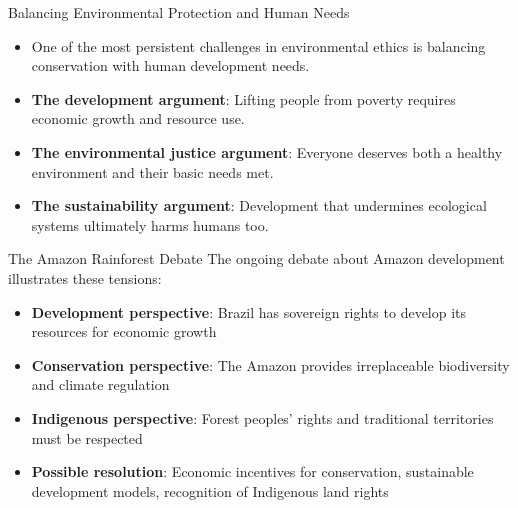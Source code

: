 \documentclass{beamer}
\begin{document}
	\begin{frame}{Balancing Environmental Protection and Human Needs}
		\begin{itemize}
			\item One of the most persistent challenges in environmental ethics is balancing conservation with human development needs.
			\item \textbf{The development argument}: Lifting people from poverty requires economic growth and resource use.
			\item \textbf{The environmental justice argument}: Everyone deserves both a healthy environment and their basic needs met.
			\item \textbf{The sustainability argument}: Development that undermines ecological systems ultimately harms humans too.
		\end{itemize}
		
		\begin{block}{The Amazon Rainforest Debate}
			\scriptsize
			The ongoing debate about Amazon development illustrates these tensions:
			\begin{itemize}
				\item \textbf{Development perspective}: Brazil has sovereign rights to develop its resources for economic growth
				\item \textbf{Conservation perspective}: The Amazon provides irreplaceable biodiversity and climate regulation
				\item \textbf{Indigenous perspective}: Forest peoples' rights and traditional territories must be respected
				\item \textbf{Possible resolution}: Economic incentives for conservation, sustainable development models, recognition of Indigenous land rights
			\end{itemize}
		\end{block}
	\end{frame}
	
\end{document}

